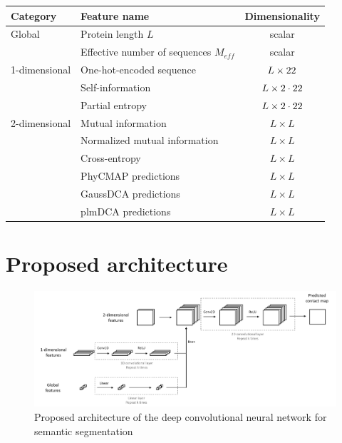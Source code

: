   \begin{table}[H]
    \centering
    \begin{tabular}{|l|l|c|}
      \hline
      Category & Feature name & Dimensionality \\
      \hline
      \hline
      Global & Protein length $L$ & scalar \\
             & Effective number of sequences $M_{eff}$ & scalar \\
      \hline
      1-dimensional & One-hot-encoded sequence & $L \times 22$ \\
                    & Self-information & $L \times 2 \cdot 22$ \\
                    & Partial entropy & $L \times 2 \cdot 22$ \\
      \hline
      2-dimensional & Mutual information & $L \times L$ \\
                    & Normalized mutual information & $L \times L$ \\
                    & Cross-entropy & $L \times L$ \\
                    & PhyCMAP predictions & $L \times L$ \\
                    & GaussDCA predictions & $L \times L$ \\
                    & plmDCA predictions & $L \times L$ \\
      \hline
    \end{tabular}
    \label{hyperparams}
  \end{table}

\section{Proposed architecture}

  \begin{figure}[H]
    \begin{center}
      \includegraphics[width=\textwidth, keepaspectratio]{imgs/architecture.png}
       \caption{Proposed architecture of the deep convolutional neural network for semantic segmentation}
      \label{architecture}
    \end{center}
  \end{figure}

